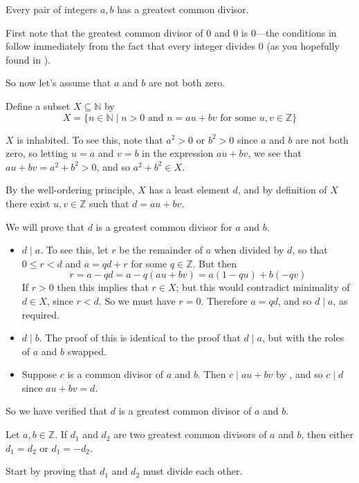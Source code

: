\begin{theorem}
\label{thmGCDsExist}
Every pair of integers $a,b$ has a greatest common divisor.
\end{theorem}
\begin{cproof}
First note that the greatest common divisor of $0$ and $0$ is $0$---the conditions in  follow immediately from the fact that every integer divides $0$ (as you hopefully found in ).

So now let's assume that $a$ and $b$ are not both zero.

Define a subset $X \subseteq \mathbb{N}$ by
\[ X = \{ n \in \mathbb{N} \mid n > 0 \text{ and } n = au+bv \text{ for some } u,v \in \mathbb{Z} \} \]

$X$ is inhabited. To see this, note that $a^2 > 0$ or $b^2 > 0$ since $a$ and $b$ are not both zero, so letting $u=a$ and $v=b$ in the expression $au+bv$, we see that $au+bv=a^2+b^2>0$, and so $a^2+b^2 \in X$.

By the well-ordering principle, $X$ has a least element $d$, and by definition of $X$ there exist $u,v \in \mathbb{Z}$ such that $d = au+bv$.

We will prove that $d$ is a greatest common divisor for $a$ and $b$.
\begin{itemize}
\item $d \mid a$. To see this, let $r$ be the remainder of $a$ when divided by $d$, so that $0 \le r < d$ and $a=qd+r$ for some $q \in \mathbb{Z}$. But then
\[ r = a-qd = a-q(au+bv) = a(1-qu) + b(-qv) \]
If $r>0$ then this implies that $r \in X$; but this would contradict minimality of $d \in X$, since $r < d$. So we must have $r=0$. Therefore $a = qd$, and so $d \mid a$, as required.
\item $d \mid b$. The proof of this is identical to the proof that $d \mid a$, but with the roles of $a$ and $b$ swapped.
\item Suppose $c$ is a common divisor of $a$ and $b$. Then $c \mid au+bv$ by , and so $c \mid d$ since $au+bv=d$.
\end{itemize}
So we have verified that $d$ is a greatest common divisor of $a$ and $b$.
\end{cproof}

\begin{exercise}
\label{exGCDUnique}
Let $a,b \in \mathbb{Z}$. If $d_1$ and $d_2$ are two greatest common divisors of $a$ and $b$, then either $d_1=d_2$ or $d_1=-d_2$.
\begin{backhint}
Start by proving that $d_1$ and $d_2$ must divide each other.
\end{backhint}
\end{exercise}

